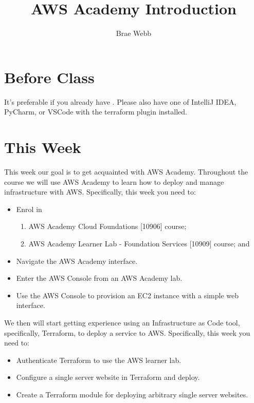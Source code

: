 \documentclass{csse4400}
\title{AWS Academy Introduction}
\author{Brae Webb}
\date{\week{1}}
\begin{document}
\maketitle

\section{Before Class}
It's preferable if you already have .
Please also have one of IntelliJ IDEA, PyCharm, or VSCode with the terraform plugin installed.

\section{This Week}
This week our goal is to get acquainted with AWS Academy.
Throughout the course we will use AWS Academy to learn how to deploy and manage infrastructure with AWS.
Specifically, this week you need to:
\begin{itemize}
    \item Enrol in
    \begin{enumerate}
        \item AWS Academy Cloud Foundations [10906] course;
        \item AWS Academy Learner Lab - Foundation Services [10909] course; and
    \end{enumerate}
    \item Navigate the AWS Academy interface.
    \item Enter the AWS Console from an AWS Academy lab.
    \item Use the AWS Console to provision an EC2 instance with a simple web interface.
\end{itemize}

We then will start getting experience using an Infrastructure as Code tool, specifically, Terraform,
to deploy a service to AWS.
Specifically, this week you need to:
\begin{itemize}
    \item Authenticate Terraform to use the AWS learner lab.
    \item Configure a single server website in Terraform and deploy.
    \item Create a Terraform module for deploying arbitrary single server websites.
\end{itemize}

\end{document}
